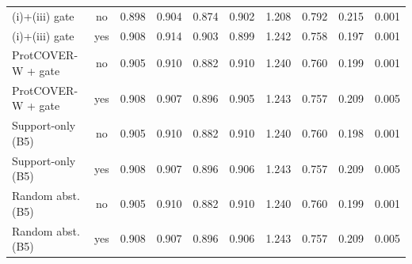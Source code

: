 \begin{longtable}{lccccccccc}
(i)+(iii) gate & no & 0.898 & 0.904 & 0.874 & 0.902 & 1.208 & 0.792 & 0.215 & 0.001 \\
(i)+(iii) gate & yes & 0.908 & 0.914 & 0.903 & 0.899 & 1.242 & 0.758 & 0.197 & 0.001 \\
ProtCOVER-W + gate & no & 0.905 & 0.910 & 0.882 & 0.910 & 1.240 & 0.760 & 0.199 & 0.001 \\
ProtCOVER-W + gate & yes & 0.908 & 0.907 & 0.896 & 0.905 & 1.243 & 0.757 & 0.209 & 0.005 \\
Support-only (B5) & no & 0.905 & 0.910 & 0.882 & 0.910 & 1.240 & 0.760 & 0.198 & 0.001 \\
Support-only (B5) & yes & 0.908 & 0.907 & 0.896 & 0.906 & 1.243 & 0.757 & 0.209 & 0.005 \\
Random abst. (B5) & no & 0.905 & 0.910 & 0.882 & 0.910 & 1.240 & 0.760 & 0.199 & 0.001 \\
Random abst. (B5) & yes & 0.908 & 0.907 & 0.896 & 0.906 & 1.243 & 0.757 & 0.209 & 0.005 \\
\bottomrule
\end{longtable}

